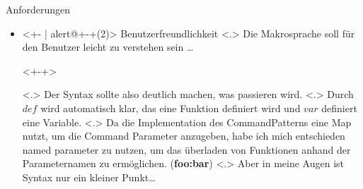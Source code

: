 \begin{frame}{Anforderungen}
\begin{itemize}
{              Ein Beispiel wäre \ldots
            }
        \begin{uncoverenv}<+->
          \tabto{4.6cm}
          \myMIn$if(has_unsaved()) \{ save(); \}$\hspace*{-4cm} %
        \end{uncoverenv}
            \note[item]<.>{
              Das ein Makro nur probiert zu speichern, wenn es etwas zum speichern gibt.
            }
            \note[item]<.>{
              Generell sollte speichern schnell gehen, allerdings kann es passieren, dass eine mehrere Gigabyte große Datei geschrieben werden muss, was dem Nutzer nicht zumuten ist.
            }
      \item<+- | alert@+-+(2)>
        Benutzerfreundlichkeit
            \note[item]<.>{
              Die Makrosprache soll für den Benutzer leicht zu verstehen sein \ldots
            }
        \begin{uncoverenv}<+-+>
          \begin{myInvBox}[width=.9\linewidth]
            
          \end{myInvBox}
          \vspace{-10em}
        \end{uncoverenv}
            \note[item]<.>{
              Der Syntax sollte also deutlich machen, was passieren wird.
            }
            \note[item]<.>{
              Durch \myMIn$def$ wird automatisch klar, das eine Funktion definiert wird und \myMIn$var$ definiert eine Variable.
            }
            \note[item]<.>{
              Da die Implementation des CommandPatterns eine Map nutzt, um die Command Parameter anzugeben, habe ich mich entschieden named parameter zu nutzen, um das überladen von Funktionen anhand der Parameternamen zu ermöglichen. (\textbf{foo:bar})
            }
            \note[item]<.>{
              Aber in meine Augen ist Syntax nur ein kleiner Punkt\ldots
            }


\end{itemize}
\end{frame}
